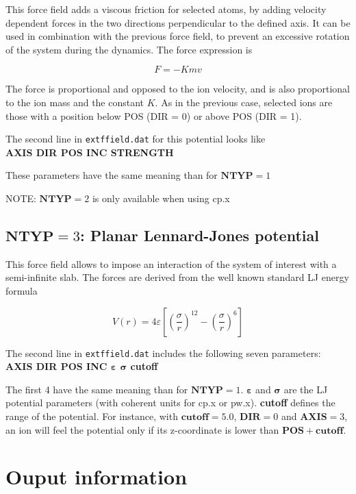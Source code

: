 \documentclass[a4paper,12pt,notitlepage]{article}
\begin{document}
This force field adds a viscous friction for selected atoms, by adding velocity dependent forces in the two directions perpendicular to the defined axis. It can be used in combination with the previous force field, to prevent an excessive rotation of the system during the dynamics. The force expression is

$$F = -Kmv$$

\noindent The force is proportional and opposed to the ion velocity, and is also proportional to the ion mass 
and the constant $K$. As in the previous case, selected ions are those with a position below POS (DIR = 0) or above POS (DIR = 1). 

\noindent The second line in \texttt{extffield.dat} for this potential looks like \\
\textbf{AXIS  DIR  POS INC STRENGTH}

\medskip

\noindent These parameters have the same meaning than for $\mathbf{NTYP}=1$ 

\noindent NOTE: $\mathbf{NTYP}=2$ is only available when using cp.x 


\subsection{$\mathbf{NTYP} = 3$: Planar Lennard-Jones potential}

This force field allows to impose an interaction of the system of interest with a semi-infinite slab. The forces are derived from the well known standard LJ energy formula

$$V(r) = 4\varepsilon\left[\left(\frac{\sigma}{r}\right)^{12} - \left(\frac{\sigma}{r}\right)^6\right]$$

\noindent The second line in \texttt{extffield.dat} includes the following seven parameters: \\
\textbf{AXIS  DIR  POS INC $\mathbf{\varepsilon}$ $\mathbf{\sigma}$ cutoff}

\medskip

\noindent The first 4 have the same meaning than for $\mathbf{NTYP}=1$. $\mathbf{\varepsilon}$ and $\mathbf{\sigma}$ are the LJ potential parameters (with coherent units for cp.x or pw.x). \textbf{cutoff} defines the range of the potential. For instance, with $\mathbf{cutoff} = 5.0$, $\mathbf{DIR} = 0$ and $\mathbf{AXIS} = 3$, an ion will feel the potential only if its z-coordinate is lower than $\mathbf{POS} + \mathbf{cutoff}$. 

\section{Ouput information}
\end{document}
